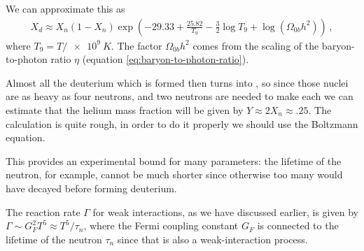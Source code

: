 \documentclass[main.tex]{subfiles}
\begin{document}

We can approximate this as 
%
\begin{align}
  X_d \approx X_n (1 - X_n)
  \exp(-29.33 + \frac{25.82}{T_9  } - \frac{3}{2} \log T_9 + \log ( \Omega_{0b} h^2 ))
\,,
\end{align}
%
where \(T_9  =  T / \SI{e9}{K}\). 
The factor \(\Omega_{0b} h^2\) comes from the scaling of the baryon-to-photon ratio \(\eta\) (equation \eqref{eq:baryon-to-photon-ratio}).



Almost all the deuterium which is formed then turns into , so since those nuclei are as heavy as four neutrons, and two neutrons are needed to make each we can estimate that the helium mass fraction will be given by \(Y \approx 2 X_n \approx \num{.25}\). 
The calculation is quite rough, in order to do it properly we should use the Boltzmann equation. 



This provides an experimental bound for many parameters: the lifetime of the neutron, for example, cannot be much shorter since otherwise too many would have decayed before forming deuterium. 

The reaction rate \(\Gamma \) for weak interactions, as we have discussed earlier, is given by \(\Gamma \sim G_F^2 T^5 \approx T^{5} / \tau _n\), where the Fermi coupling constant \(G_F\) is connected to the lifetime of the neutron \(\tau_n\) since that is also a weak-interaction process.
\end{document}
